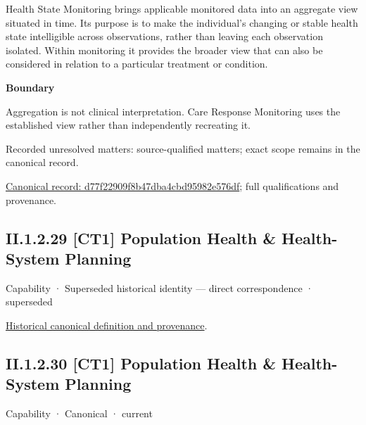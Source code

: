 Health State Monitoring brings applicable monitored data into an aggregate view situated in time. Its purpose is to make the individual's changing or stable health state intelligible across observations, rather than leaving each observation isolated. Within monitoring it provides the broader view that can also be considered in relation to a particular treatment or condition.



\textbf{Boundary}



Aggregation is not clinical interpretation. Care Response Monitoring uses the established view rather than independently recreating it.


{\small Recorded unresolved matters: source-qualified matters; exact scope remains in the canonical record.}\par
{\footnotesize \href{../../../../continuum/strategy/capability/d77f22909f8b47dba4cbd95982e576df.md}{Canonical record: d77f22909f8b47dba4cbd95982e576df}; full qualifications and provenance.}\par
\subsection*{II.1.2.29 [CT1] Population Health \& Health-System Planning}
\label{navigation:II.1.2.29}

\label{element:a5003436a7f348b1bff60ba593adfa27}
{\small Capability · Superseded historical identity — direct correspondence · superseded}\par
\href{../../../../continuum/strategy/capability/a5003436a7f348b1bff60ba593adfa27.md}{Historical canonical definition and provenance}.\par
\subsection*{II.1.2.30 [CT1] Population Health \& Health-System Planning}
\label{navigation:II.1.2.30}

\label{element:c63b38b37e9b4e9b97dc87ed54604def}
{\small Capability · Canonical · current}\par

